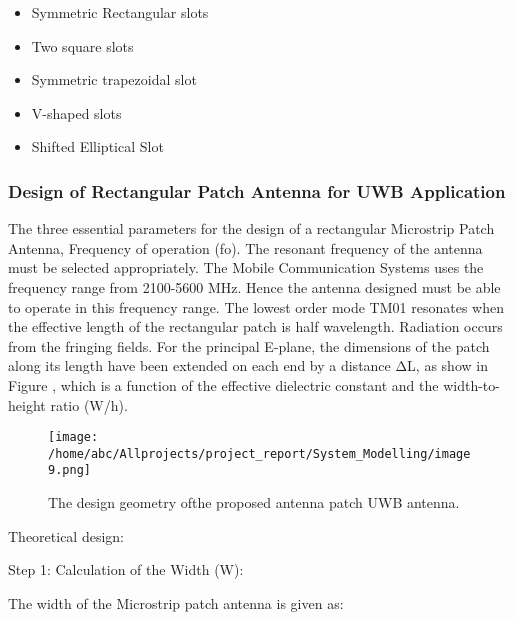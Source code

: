 \documentclass[12pt]{article}
\begin{document}
				                \begin{itemize}

				                	\item Symmetric Rectangular slots
				                	\item Two square slots 
				                	\item Symmetric trapezoidal slot 
				                	\item V-shaped slots
				                	\item Shifted Elliptical Slot
				                	
				                \end{itemize}
				               \subsubsection{ Design of  Rectangular Patch Antenna for UWB Application}
				                \justify
				                 The three essential parameters for the design of a rectangular Microstrip Patch Antenna, Frequency of operation (fo). The resonant frequency of the antenna must be selected appropriately. The Mobile Communication Systems uses the frequency range from 2100-5600 MHz. Hence the antenna designed must be able to operate in this frequency range. The lowest order mode TM01 resonates when the effective length of the rectangular patch is half wavelength. Radiation occurs from the fringing fields. For the principal E-plane, the dimensions of the patch along its length have been extended on each end by a distance ΔL, as show in Figure , which is a function of the effective dielectric constant and the width-to-height ratio (W/h).
				                  \begin{figure}
				                  	\centering
				                  	\texttt{[image: /home/abc/Allprojects/project\_report/System\_Modelling/image9.png]}
				                  	\caption{The design geometry ofthe proposed antenna patch UWB antenna.}	             	
				                  \end{figure}
				                  
				                 Theoretical design:
				                 
				                 Step 1: Calculation of the Width (W):
				                  
				                 The width of the Microstrip patch antenna is given as: 
				                 					                                           
\end{document}
